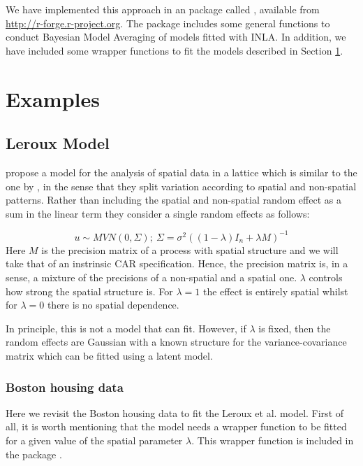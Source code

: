 \documentclass[article]{jss}
\begin{document}
We have implemented this approach in an  package called ,
available from \url{http://r-forge.r-project.org}. The package includes some
general functions to conduct Bayesian Model Averaging of models fitted with
INLA. In addition, we have included some wrapper functions to fit the models
described in Section \ref{sec:examples}.


\section{Examples}
\label{sec:examples}

\subsection{Leroux Model}

\citet{Lerouxetal:1999} propose a model for the analysis of spatial data in a
lattice which is similar to the one by \citet{besagetal:1991}, in the sense
that they split variation according to  spatial and non-spatial patterns.
Rather than including the spatial and non-spatial random effect as a sum in the
linear term they consider a single random effects as follows:

\begin{equation}
u \sim MVN(0, \Sigma);\ \Sigma=\sigma^2 ((1-\lambda) I_n+\lambda M)^{-1}
\label{eq:leroux}
\end{equation}
\noindent
Here $M$ is the precision matrix of a process with spatial structure and we
will take that of an instrinsic CAR specification. Hence, the precision matrix
is, in a sense, a mixture of the precisions of a non-spatial and a spatial
one. $\lambda$ controls how strong the spatial structure is. For $\lambda=1$
the effect is entirely spatial whilst for $\lambda=0$ there is no spatial
dependence.

In principle, this is not a model that  can fit. However, if
$\lambda$ is fixed, then the random effects are Gaussian with a known structure
for the variance-covariance matrix which can be fitted using a 
latent model.

\subsubsection{Boston housing data}

Here we revisit the Boston housing data to fit the Leroux et al. model.  First
of all, it is worth mentioning that the model needs a wrapper function to be
fitted for a given value of the spatial parameter $\lambda$. This
wrapper function is included in the  package .
\end{document}
